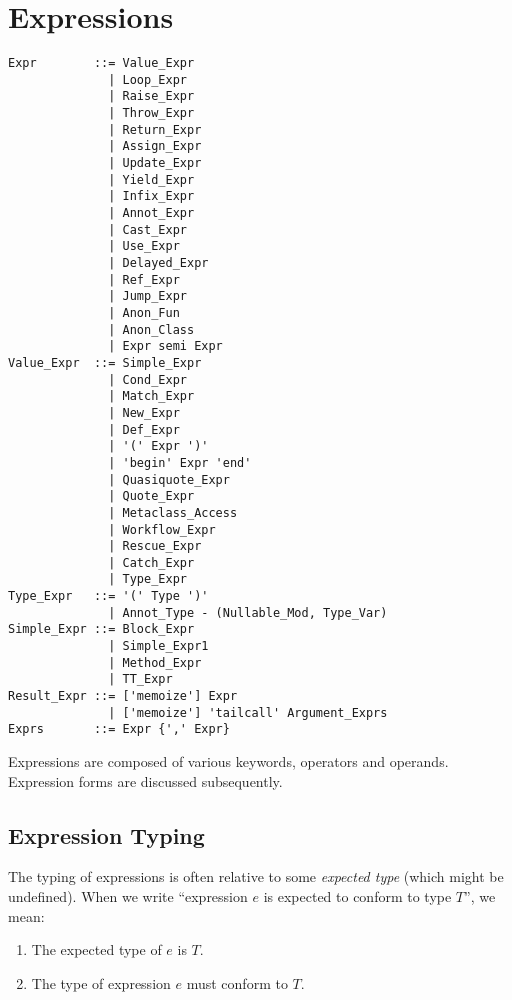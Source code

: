 
\chapter{Expressions}

\minitoc

\newpage


\syntax\begin{lstlisting}
Expr        ::= Value_Expr
              | Loop_Expr
              | Raise_Expr 
              | Throw_Expr
              | Return_Expr
              | Assign_Expr
              | Update_Expr
              | Yield_Expr
              | Infix_Expr
              | Annot_Expr
              | Cast_Expr
              | Use_Expr
              | Delayed_Expr
              | Ref_Expr
              | Jump_Expr
              | Anon_Fun
              | Anon_Class
              | Expr semi Expr
Value_Expr  ::= Simple_Expr
              | Cond_Expr
              | Match_Expr
              | New_Expr
              | Def_Expr
              | '(' Expr ')'
              | 'begin' Expr 'end'
              | Quasiquote_Expr
              | Quote_Expr
              | Metaclass_Access
              | Workflow_Expr
              | Rescue_Expr
              | Catch_Expr
              | Type_Expr
Type_Expr   ::= '(' Type ')'
              | Annot_Type - (Nullable_Mod, Type_Var)
Simple_Expr ::= Block_Expr
              | Simple_Expr1
              | Method_Expr
              | TT_Expr
Result_Expr ::= ['memoize'] Expr
              | ['memoize'] 'tailcall' Argument_Exprs
Exprs       ::= Expr {',' Expr}
\end{lstlisting}

Expressions are composed of various keywords, operators and operands. Expression forms are discussed subsequently. 







\section{Expression Typing}
\label{sec:expression-typing}

The typing of expressions is often relative to some {\em expected type} (which might be undefined). When we write ``expression $e$ is expected to conform to type $T$'', we mean:
\begin{enumerate}
\item The expected type of $e$ is $T$.
\item The type of expression $e$ must conform to $T$. 
\end{enumerate}

